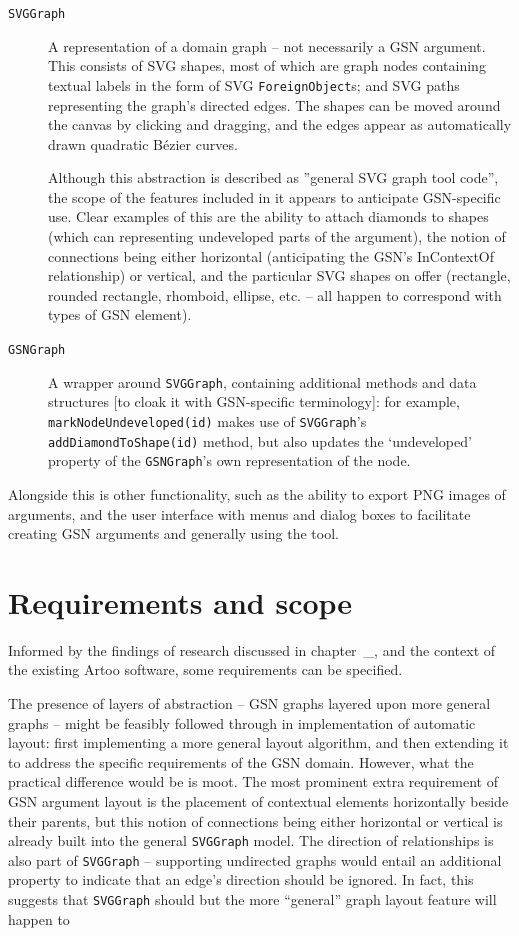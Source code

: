 \begin{description}

\item[{\tt SVGGraph}] A representation of a domain graph -- not necessarily a GSN argument.
This consists of SVG shapes, most of which are graph nodes containing textual labels in the form of SVG {\tt ForeignObject}s; and SVG paths representing the graph's directed edges.
The shapes can be moved around the canvas by clicking and dragging, and the edges appear as automatically drawn quadratic B\'{e}zier curves. 

Although this abstraction is described as ''general SVG graph tool code'', the scope of the features included in it appears to anticipate GSN-specific use. Clear examples of this are the ability to attach diamonds to shapes (which can representing undeveloped parts of the argument), the notion of connections being either horizontal (anticipating the GSN's InContextOf relationship) or vertical, and the particular SVG shapes on offer (rectangle, rounded rectangle, rhomboid, ellipse, etc. -- all happen to correspond with types of GSN element).

\item[{\tt GSNGraph}] A wrapper around {\tt SVGGraph}, containing additional methods and data structures [to cloak it with GSN-specific terminology]: for example, {\tt markNodeUndeveloped(id)} makes use of {\tt SVGGraph}'s {\tt addDiamondToShape(id)} method, but also updates the `undeveloped' property of the {\tt GSNGraph}'s own representation of the node.

\end{description}
  
Alongside this is other functionality, such as the ability to export PNG images of arguments, and the user interface with menus and dialog boxes to facilitate creating GSN arguments and generally using the tool.


\section{Requirements and scope}

Informed by the findings of research discussed in chapter~\_, and the context of the existing Artoo software, some requirements can be specified.

The presence of layers of abstraction -- GSN graphs layered upon more general graphs -- might be feasibly followed through in implementation of automatic layout: first implementing a more general layout algorithm, and then  extending it to address the specific requirements of the GSN domain. However, what the practical difference would be is moot. The most prominent extra requirement of GSN argument layout is the placement of contextual elements horizontally beside their parents, but this notion of connections being either horizontal or vertical is already built into the general {\tt SVGGraph} model. The direction of relationships is also part of {\tt SVGGraph} -- supporting undirected graphs would entail an additional property to indicate that an edge's direction should be ignored. In fact, this suggests that {\tt SVGGraph} should but the more ``general'' graph layout feature will happen to 

